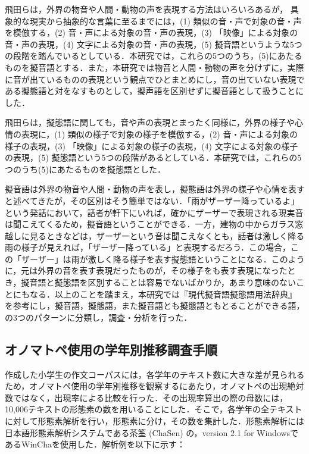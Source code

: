 \documentclass[japanese]{jnlp_1.4}
\begin{document}
飛田ら\cite{Bk_HidAl}は，外界の物音や人間・動物の声を表現する方法はいろいろあるが，
\break
具象的な現実から抽象的な言葉に至るまでには，(1) 類似の音・声で対象の音・声を模倣する，(2) 音・声による対象の音・声の表現，(3) 「映像」による対象の音・声の表現，(4) 文字による対象の音・声の表現，(5) 擬音語というような5つの段階を踏んでいるとしている．本研究では，これらの5つのうち，(5)にあたるものを擬音語とする．また，本研究では物音と人間・動物の声を分けずに，実際に音が出ているものの表現という観点でひとまとめにし，音の出ていない表現である擬態語と対をなすものとして，擬声語を区別せずに擬音語として扱うことにした．

飛田らは，擬態語に関しても，音や声の表現とまったく同様に，外界の様子や心情の表現に，(1) 類似の様子で対象の様子を模倣する，(2) 音・声による対象の様子の表現，(3) 「映像」による対象の様子の表現，(4) 文字による対象の様子の表現，(5) 擬態語という5つの段階があるとしている．本研究では，これらの5つのうち(5)にあたるものを擬態語とした．

擬音語は外界の物音や人間・動物の声を表し，擬態語は外界の様子や心情を表すと述べてきたが，その区別はそう簡単ではない．「雨がザーザー降っているよ」という発話において，話者が軒下にいれば，確かにザーザーで表現される現実音は聞こえてくるため，擬音語ということができる．一方，建物の中からガラス窓越しに見るときなどは，ザーザーという音は聞こえなくとも，話者は激しく降る雨の様子が見えれば，「ザーザー降っている」と表現するだろう．この場合，この「ザーザー」は雨が激しく降る様子を表す擬態語ということになる．このように，元は外界の音を表す表現だったものが，その様子をも表す表現になったとき，擬音語と擬態語を区別することは容易でないばかりか，あまり意味のないことにもなる．以上のことを踏まえ，本研究では『現代擬音語擬態語用法辞典』\cite{Bk_HidAl} を参考にし，擬音語，擬態語，また擬音語とも擬態語ともとることができる語，の3つのパターンに分類し，調査・分析を行った．


\subsection{オノマトペ使用の学年別推移調査手順}

作成した小学生の作文コーパスには，各学年のテキスト数に大きな差が見られるため，オノマトペ使用の学年別推移を観察するにあたり，オノマトペの出現絶対数ではなく，出現率による比較を行った．その出現率算出の際の母数には，10,006テキストの形態素の数を用いることにした．そこで，各学年の全テキストに対して形態素解析を行い，形態素に分け，その数を集計した．形態素解析には日本語形態素解析システムである茶筌 (ChaSen) の，version 2.1 for WindowsであるWinChaを使用した．解析例を以下に示す： \\
\end{document}
